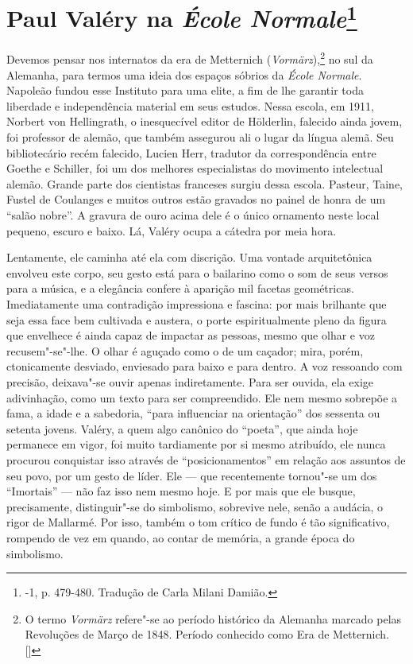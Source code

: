 \chapter{Paul Valéry na \emph{École Normale}\footnote[*]{-1, p. 479-480. Tradução de Carla Milani Damião.}}

Devemos pensar nos internatos da era de Metternich
(\emph{Vormärz}),\footnote{O termo \emph{Vormärz} refere"-se ao período
  histórico da Alemanha marcado pelas Revoluções de Março de 1848.
  Período conhecido como Era de Metternich. []} no sul da
Alemanha, para termos uma ideia dos espaços sóbrios da \emph{École
Normale}. Napoleão fundou esse Instituto para uma elite, a fim de lhe
garantir toda liberdade e independência material em seus estudos. Nessa
escola, em 1911, Norbert von Hellingrath, o inesquecível editor de
Hölderlin, falecido ainda jovem, foi professor de alemão, que também
assegurou ali o lugar da língua alemã. Seu bibliotecário recém falecido,
Lucien Herr, tradutor da correspondência entre Goethe e Schiller, foi um
dos melhores especialistas do movimento intelectual alemão. Grande parte
dos cientistas franceses surgiu dessa escola. Pasteur, Taine, Fustel de
Coulanges e muitos outros estão gravados no painel de honra de um
``salão nobre''. A gravura de ouro acima dele é o único ornamento neste local
pequeno, escuro e baixo. Lá, Valéry ocupa a cátedra por meia
hora.

Lentamente, ele caminha até ela com discrição. Uma vontade
arquitetônica envolveu este corpo, seu gesto está para o bailarino como
o som de seus versos para a música, e a elegância confere à aparição mil
facetas geométricas. Imediatamente uma contradição impressiona e
fascina: por mais brilhante que seja essa face bem cultivada e austera,
o porte espiritualmente pleno da figura que envelhece é ainda capaz de
impactar as pessoas, mesmo que olhar e voz recusem"-se"-lhe. O olhar é
aguçado como o de um caçador; mira, porém, ctonicamente desviado, enviesado
para baixo e para dentro. A voz ressoando com precisão, deixava"-se ouvir apenas
indiretamente. Para ser ouvida, ela exige adivinhação, como um texto
para ser compreendido. Ele nem mesmo sobrepõe a fama, a idade e a sabedoria,
``para influenciar na orientação'' dos sessenta ou setenta jovens.
Valéry, a quem algo canônico do ``poeta'', que ainda hoje permanece em
vigor, foi muito tardiamente por si mesmo atribuído, ele nunca
procurou conquistar isso através de ``posicionamentos'' em relação aos
assuntos de seu povo, por um gesto de líder. Ele --- que recentemente
tornou"-se um dos ``Imortais'' --- não faz isso nem mesmo hoje. E por mais
que ele busque, precisamente, distinguir"-se do simbolismo, sobrevive nele, senão a audácia, o rigor de
Mallarmé. Por isso, também o
tom crítico de fundo é tão significativo, rompendo de vez em quando, ao
contar de memória, a grande época do simbolismo.

